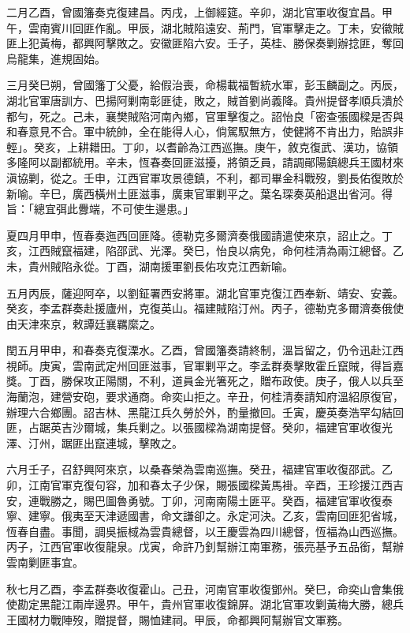 \begin{pinyinscope}
二月乙酉，曾國籓奏克復建昌。丙戌，上御經筵。辛卯，湖北官軍收復宜昌。甲午，雲南賓川回匪作亂。甲辰，湖北賊陷遠安、荊門，官軍擊走之。丁未，安徽賊匪上犯黃梅，都興阿擊敗之。安徽匪陷六安。壬子，英桂、勝保奏剿辦捻匪，奪回烏龍集，進規固始。

三月癸巳朔，曾國籓丁父憂，給假治喪，命楊載福暫統水軍，彭玉麟副之。丙辰，湖北官軍唐訓方、巴揚阿剿南彰匪徒，敗之，賊首劉尚義降。貴州提督孝順兵潰於都勻，死之。己未，襄樊賊陷河南內鄉，官軍擊復之。詔怡良「密查張國樑是否與和春意見不合。軍中統帥，全在能得人心，倘駕馭無方，使健將不肯出力，貽誤非輕」。癸亥，上耕耤田。丁卯，以耆齡為江西巡撫。庚午，敘克復武、漢功，協領多隆阿以副都統用。辛未，恆春奏回匪滋擾，將領乏員，請調鄖陽鎮總兵王國材來滇協剿，從之。壬申，江西官軍攻景德鎮，不利，都司畢金科戰歿，劉長佑復敗於新喻。辛巳，廣西橫州土匪滋事，廣東官軍剿平之。葉名琛奏英船退出省河。得旨：「總宜弭此釁端，不可使生邊患。」

夏四月甲申，恆春奏迤西回匪降。德勒克多爾濟奏俄國請遣使來京，詔止之。丁亥，江西賊竄福建，陷邵武、光澤。癸巳，怡良以病免，命何桂清為兩江總督。乙未，貴州賊陷永從。丁酉，湖南援軍劉長佑攻克江西新喻。

五月丙辰，薩迎阿卒，以劉鉦署西安將軍。湖北官軍克復江西奉新、靖安、安義。癸亥，李孟群奏赴援廬州，克復英山。福建賊陷汀州。丙子，德勒克多爾濟奏俄使由天津來京，敕譚廷襄羈縻之。

閏五月甲申，和春奏克復溧水。乙酉，曾國籓奏請終制，溫旨留之，仍令迅赴江西視師。庚寅，雲南武定州回匪滋事，官軍剿平之。李孟群奏擊敗霍丘竄賊，得旨嘉獎。丁酉，勝保攻正陽關，不利，道員金光箸死之，贈布政使。庚子，俄人以兵至海蘭泡，建營安砲，要求通商。命奕山拒之。辛丑，何桂清奏請知府溫紹原復官，辦理六合鄉團。詔吉林、黑龍江兵久勞於外，酌量撤回。壬寅，慶英奏浩罕勾結回匪，占踞英吉沙爾城，集兵剿之。以張國樑為湖南提督。癸卯，福建官軍收復光澤、汀州，踞匪出竄連城，擊敗之。

六月壬子，召舒興阿來京，以桑春榮為雲南巡撫。癸丑，福建官軍收復邵武。乙卯，江南官軍克復句容，加和春太子少保，賜張國樑黃馬褂。辛酉，王珍援江西吉安，連戰勝之，賜巴圖魯勇號。丁卯，河南南陽土匪平。癸酉，福建官軍收復泰寧、建寧。俄夷至天津遞國書，命文謙卻之。永定河決。乙亥，雲南回匪犯省城，恆春自盡。事聞，調吳振棫為雲貴總督，以王慶雲為四川總督，恆福為山西巡撫。丙子，江西官軍收復龍泉。戊寅，命許乃釗幫辦江南軍務，張亮基予五品銜，幫辦雲南剿匪事宜。

秋七月乙酉，李孟群奏收復霍山。己丑，河南官軍收復鄧州。癸巳，命奕山會集俄使勘定黑龍江兩岸邊界。甲午，貴州官軍收復錦屏。湖北官軍攻剿黃梅大勝，總兵王國材力戰陣歿，贈提督，賜恤建祠。甲辰，命都興阿幫辦官文軍務。


\end{pinyinscope}

